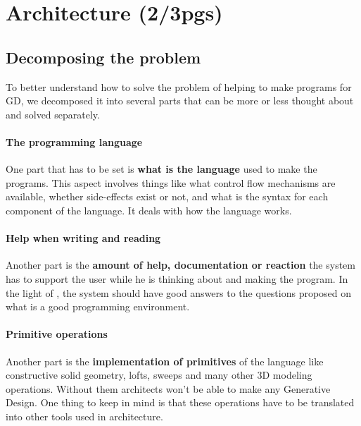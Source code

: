 \documentclass{./llncs2e/llncs}
\begin{document}

\section{Architecture (2/3pgs)}

\subsection{Decomposing the problem}
	To better understand how to solve the problem of helping to make programs for GD, we decomposed it into several parts that can be more or less thought about and solved separately.
	
	\paragraph{The programming language}
	One part that has to be set is \textbf{what is the language} used to make the programs.
	This aspect involves things like what control flow mechanisms are available, whether side-effects exist or not, and what is the syntax for each component of the language.
	It deals with how the language works.

	\paragraph{Help when writing and reading}
	Another part is the \textbf{amount of help, documentation or reaction} the system has to support the user while he is thinking about and making the program.
	In the light of \cite{victor2012learnable}, the system should have good answers to the questions proposed on what is a good programming environment.

	\paragraph{Primitive operations}
	Another part is the \textbf{implementation of primitives} of the language like constructive solid geometry, lofts, sweeps and many other 3D modeling operations.
	Without them architects won't be able to make any Generative Design.
	One thing to keep in mind is that these operations have to be translated into other tools used in architecture.
\end{document}
